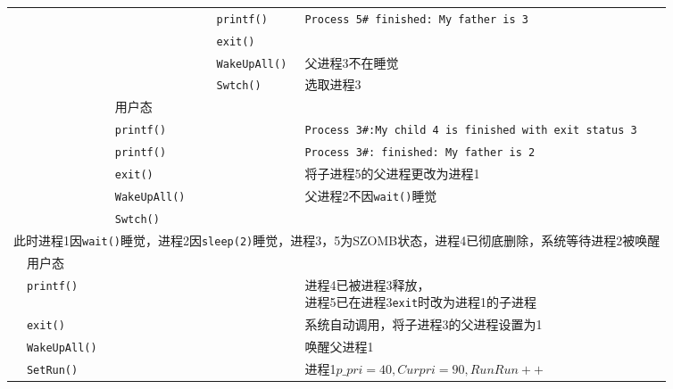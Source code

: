 \begin{landscape}
\begin{longtable}{llllll}
                 &                      &     &                &            \texttt{printf()}    & \texttt{Process 5\# finished: My father is 3}\\
                 &                      &     &                &            \texttt{exit()}    & \\
                 &                      &     &                &            \texttt{WakeUpAll()} &父进程3不在睡觉 \\
                 &                      &     &                &            \texttt{Swtch()}    & 选取进程3\\
                 &                      &用户态   &           &             & \\
                 &                      &\texttt{printf()}   &           &             &\texttt{Process 3\#:My child 4 is finished with exit status 3} \\
                 &                      &\texttt{printf()}   &           &             &\texttt{Process 3\#: finished: My father is 2} \\
                 &                      &\texttt{exit()}   &           &             &将子进程5的父进程更改为进程1\\
                 &                      &\texttt{WakeUpAll()}   &           &             &父进程2不因\texttt{wait()}睡觉\\
                 &                      &\texttt{Swtch()}   &           &             &\\
                 \multicolumn{6}{c}{此时进程1因\texttt{wait()}睡觉，进程2因\texttt{sleep(2)}睡觉，进程3，5为SZOMB状态，进程4已彻底删除，系统等待进程2被唤醒}\\
                 &                用户态 &        &           &             &\\
                 &                \texttt{printf()}   &                &           &             &\makecell[l]{进程4已被进程3释放，\\进程5已在进程3\texttt{exit}时改为进程1的子进程}\\
                 &                \texttt{exit()}   &                &           &             &系统自动调用，将子进程3的父进程设置为1\\
                 &                \texttt{WakeUpAll()}   &                &           &             &唤醒父进程1\\
                 &                \texttt{SetRun()}   &                &           &             &进程1$p\_pri=40,Curpri=90,RunRun++$\\

\end{longtable}
\end{landscape}
